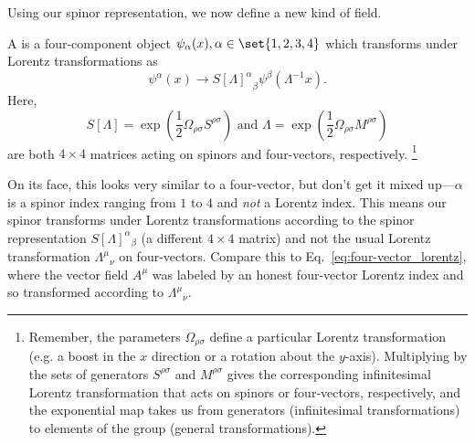 Using our spinor representation, we now define a new kind of field.
\begin{defn}
    A  is a four-component object $\psi_\alpha(x), \alpha \in \set{1,2,3,4}$ which transforms under Lorentz transformations as
    \begin{equation}
        \psi^\alpha(x) \to {S[\Lambda]^\alpha}_\beta \psi^\beta(\Lambda^{-1}x).
    \end{equation}
    Here,
    \begin{equation}
        S[\Lambda]=\exp \left(\frac{1}{2}\Omega_{\rho\sigma}S^{\rho\sigma}\right)\text{ and }\Lambda=\exp\left(\frac{1}{2}\Omega_{\rho\sigma} M^{\rho\sigma}\right)
    \end{equation}
    are both $4\times 4$ matrices acting on spinors and four-vectors, respectively.%
        \footnote{Remember, the parameters $\Omega_{\rho\sigma}$ define a particular Lorentz transformation (e.g. a boost in the $x$ direction or a rotation about the $y$-axis). Multiplying by the sets of generators $S^{\rho\sigma}$ and $M^{\rho\sigma}$ gives the corresponding infinitesimal Lorentz transformation that acts on spinors or four-vectors, respectively, and the exponential map takes us from generators (infinitesimal transformations) to elements of the group (general transformations).}
\end{defn}
On its face, this looks very similar to a four-vector, but don't get it mixed up---$\alpha$ is a spinor index ranging from $1$ to $4$ and \emph{not} a Lorentz index. This means our spinor transforms under Lorentz transformations according to the spinor representation $S[\Lambda]^\alpha{}_\beta$ (a different $4\times 4$ matrix) and not the usual Lorentz transformation $\Lambda^\mu{}_\nu$ on four-vectors. Compare this to Eq.~\eqref{eq:four-vector_lorentz}, where the vector field $A^\mu$ was labeled by an honest four-vector Lorentz index and so transformed according to $\Lambda^\mu{}_\nu$.

